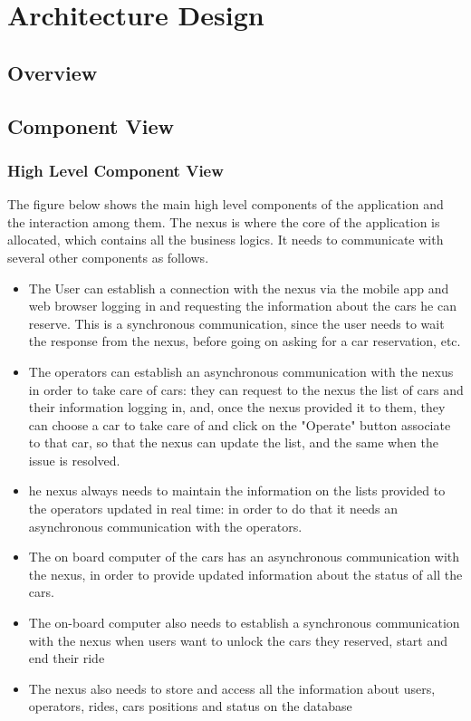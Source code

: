 \documentclass{article}
\begin{document}
\section{Architecture Design}  %
\subsection{Overview}  %
\subsection{Component View} %
\subsubsection{High Level Component View}  %
The figure below shows the main high level components of the application and the interaction among them. The nexus is where the core of the application is allocated, which contains all the business logics. It needs to communicate with several other components as follows.
\begin {itemize}
\item The User can establish a connection with the nexus via the mobile app and web browser logging in and requesting the information about the cars he can reserve. This is a synchronous communication, since the user needs to wait the response from the nexus, before going on asking for a car reservation, etc. 
\item The operators can establish an asynchronous communication with the nexus in order to take care of cars: they can request to the nexus the list of cars and their information logging in, and, once the nexus provided it to them, they can choose a car to take care of and click on the "Operate" button associate to that car, so that the nexus can update the list, and the same when the issue is resolved.
\item he nexus always needs to maintain the information on the lists provided to the operators updated in real time: in order to do that it needs an asynchronous communication  with the operators.
\item The on board computer of the cars has an asynchronous communication with the nexus, in order to provide updated information about the status of all the cars.
\item The on-board computer also needs to establish a synchronous communication with the nexus  when users want to unlock the cars they reserved, start and end their ride
\item The nexus also needs to store and access all the information about users, operators, rides, cars positions and status on the database
\end{itemize}
\end{document}
